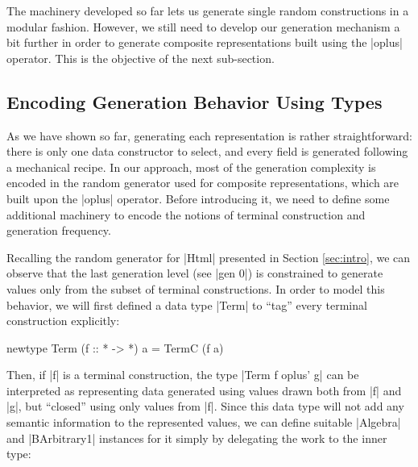 %
%
The machinery developed so far lets us generate single random constructions in a
modular fashion.
%
However, we still need to develop our generation mechanism a bit further in
order to generate composite representations built using the |oplus| operator.
%
This is the objective of the next sub-section.


%
\subsection{Encoding Generation Behavior Using Types}

As we have shown so far, generating each representation is rather
straightforward: there is only one data constructor to select, and every field
is generated following a mechanical recipe.
%
In our approach, most of the generation complexity is encoded in the random
generator used for composite representations, which are built upon the |oplus|
operator.
%
Before introducing it, we need to define some additional machinery to encode the
notions of terminal construction and generation frequency.


Recalling the random generator for |Html| presented in Section \ref{sec:intro},
we can observe that the last generation level (see |gen 0|) is constrained to
generate values only from the subset of terminal constructions.
%
In order to model this behavior, we will first defined a data type |Term| to
``tag'' every terminal construction explicitly:

\begin{code}
newtype Term (f :: * -> *) a = TermC (f a)
\end{code}
%
Then, if |f| is a terminal construction, the type |Term f oplus' g| can be
interpreted as representing data generated using values drawn both from |f| and
|g|, but ``closed'' using only values from |f|.
%
Since this data type will not add any semantic information to the represented
values, we can define suitable |Algebra| and |BArbitrary1| instances for it
simply by delegating the work to the inner type:



